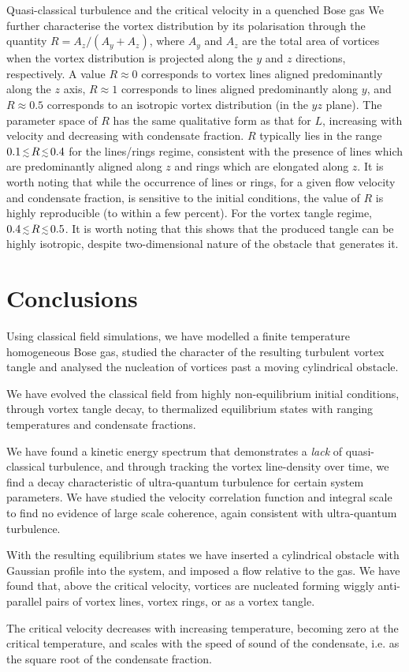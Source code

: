 \begin{chapter}{\label{cha:nonequib}Quasi-classical turbulence and the critical velocity in a quenched Bose gas}
We further characterise the vortex distribution by its polarisation through the quantity $R=A_z/(A_y+A_z)$, where $A_y$ and $A_z$ are the total area of vortices when the vortex distribution is projected along the $y$ and $z$ directions, respectively.  A value $R \approx 0$ corresponds to vortex lines aligned predominantly along the $z$ axis, $R\approx 1$ corresponds to lines aligned predominantly along $y$, and $R\approx 0.5$ corresponds to an isotropic vortex distribution (in the $yz$ plane).  The parameter space of $R$ has the same qualitative form as that for $L$, increasing with velocity and decreasing with condensate fraction. $R$ typically lies in the range $0.1 \,\mbox{\footnotesize$\lesssim$}\, R\,\mbox{\footnotesize$\lesssim$}\, 0.4$ for the lines/rings regime, consistent with the presence of lines which are predominantly aligned along $z$ and rings which are elongated along $z$.  It is worth noting that while the occurrence of lines or rings, for a given flow velocity and condensate fraction, is sensitive to the initial conditions, the value of $R$ is highly reproducible (to within a few percent).       For the vortex tangle regime, $0.4 \,\mbox{\footnotesize$\lesssim$}\, R\,\mbox{\footnotesize$\lesssim$}\, 0.5$.  It is worth noting that this shows that the produced tangle can be highly isotropic, despite two-dimensional nature of the obstacle that generates it.

\section{Conclusions\label{sec:conclusions}}

Using classical field simulations, we have modelled a finite temperature homogeneous Bose gas, 
studied the character of the resulting turbulent vortex tangle and analysed the nucleation
of vortices past a moving cylindrical obstacle.

We have evolved the classical field
from highly non-equilibrium initial conditions, through vortex tangle decay, to thermalized equilibrium
states with ranging temperatures and condensate fractions.

We have found a kinetic energy spectrum that demonstrates a {\it lack} of quasi-classical turbulence, and through tracking the vortex line-density over time, we find a decay characteristic of ultra-quantum turbulence for certain system parameters. We have studied the velocity correlation function and integral scale to find no evidence of large scale coherence, again consistent with ultra-quantum turbulence.

With the resulting equilibrium states we have inserted a cylindrical obstacle with Gaussian profile into the system, and imposed a flow relative to the gas.  We have found that, above the critical velocity, vortices are nucleated forming wiggly anti-parallel pairs of vortex lines, vortex rings, or as a vortex tangle.

The critical velocity decreases with increasing temperature, becoming zero at the critical temperature, and scales with the speed of sound of the condensate, i.e. as the square root of the condensate fraction.
\end{chapter}